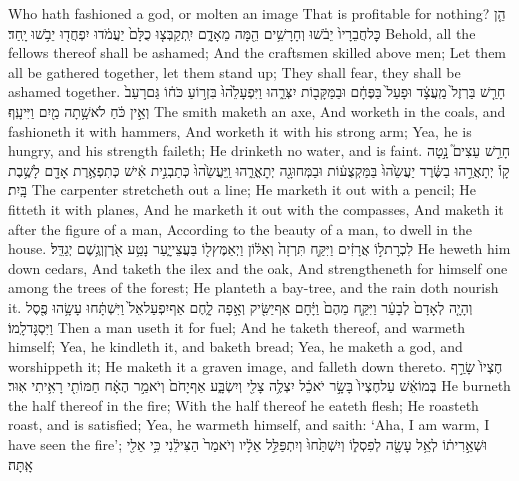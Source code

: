 {Who hath fashioned a god, or molten an image That is profitable for nothing?}
{הֵ֤ן כׇּל\maqqaf חֲבֵרָיו֙ יֵבֹ֔שׁוּ וְחָרָשִׁ֥ים הֵ֖מָּה מֵאָדָ֑ם יִֽתְקַבְּצ֤וּ כֻלָּם֙ יַעֲמֹ֔דוּ יִפְחֲד֖וּ יֵבֹ֥שׁוּ יָֽחַד׃}
{Behold, all the fellows thereof shall be ashamed; And the craftsmen skilled above men; Let them all be gathered together, let them stand up; They shall fear, they shall be ashamed together.}
{חָרַ֤שׁ בַּרְזֶל֙ מַֽעֲצָ֔ד וּפָעַל֙ בַּפֶּחָ֔ם וּבַמַּקָּב֖וֹת יִצְּרֵ֑הוּ וַיִּפְעָלֵ֙הוּ֙ בִּזְר֣וֹעַ כֹּח֔וֹ גַּם\maqqaf רָעֵב֙ וְאֵ֣ין כֹּ֔חַ לֹא\maqqaf שָׁ֥תָה מַ֖יִם וַיִּיעָֽף׃}
{The smith maketh an axe, And worketh in the coals, and fashioneth it with hammers, And worketh it with his strong arm; Yea, he is hungry, and his strength faileth; He drinketh no water, and is faint.}
{חָרַ֣שׁ עֵצִים֮ נָ֣טָה קָו֒ יְתָאֲרֵ֣הוּ בַשֶּׂ֔רֶד יַעֲשֵׂ֙הוּ֙ בַּמַּקְצֻע֔וֹת וּבַמְּחוּגָ֖ה יְתׇאֳרֵ֑הוּ וַֽיַּעֲשֵׂ֙הוּ֙ כְּתַבְנִ֣ית אִ֔ישׁ כְּתִפְאֶ֥רֶת אָדָ֖ם לָשֶׁ֥בֶת בָּֽיִת׃}
{The carpenter stretcheth out a line; He marketh it out with a pencil; He fitteth it with planes, And he marketh it out with the compasses, And maketh it after the figure of a man, According to the beauty of a man, to dwell in the house.}
{לִכְרׇת\maqqaf ל֣וֹ אֲרָזִ֔ים וַיִּקַּ֤ח תִּרְזָה֙ וְאַלּ֔וֹן וַיְאַמֶּץ\maqqaf ל֖וֹ בַּעֲצֵי\maqqaf יָ֑עַר נָטַ֥ע אֹ֖רֶ\footnotesize ן\normalsize  וְגֶ֥שֶׁם יְגַדֵּֽל׃}
{He heweth him down cedars, And taketh the ilex and the oak, And strengtheneth for himself one among the trees of the forest; He planteth a bay-tree, and the rain doth nourish it.}
{וְהָיָ֤ה לְאָדָם֙ לְבָעֵ֔ר וַיִּקַּ֤ח מֵהֶם֙ וַיָּ֔חׇם אַף\maqqaf יַשִּׂ֖יק וְאָ֣פָה לָ֑חֶם אַף\maqqaf יִפְעַל\maqqaf אֵל֙ וַיִּשְׁתָּ֔חוּ עָשָׂ֥הוּ פֶ֖סֶל וַיִּסְגׇּד\maqqaf לָֽמוֹ׃}
{Then a man useth it for fuel; And he taketh thereof, and warmeth himself; Yea, he kindleth it, and baketh bread; Yea, he maketh a god, and worshippeth it; He maketh it a graven image, and falleth down thereto.}
{חֶצְיוֹ֙ שָׂרַ֣ף בְּמוֹ\maqqaf אֵ֔שׁ עַל\maqqaf חֶצְיוֹ֙ בָּשָׂ֣ר יֹאכֵ֔ל יִצְלֶ֥ה צָלִ֖י וְיִשְׂבָּ֑ע אַף\maqqaf יָחֹם֙ וְיֹאמַ֣ר הֶאָ֔ח חַמּוֹתִ֖י רָאִ֥יתִי אֽוּר׃}
{He burneth the half thereof in the fire; With the half thereof he eateth flesh; He roasteth roast, and is satisfied; Yea, he warmeth himself, and saith: ‘Aha, I am warm, I have seen the fire’;}
{וּשְׁאֵ֣רִית֔וֹ לְאֵ֥ל עָשָׂ֖ה לְפִסְל֑וֹ  וְיִשְׁתַּ֙חוּ֙ וְיִתְפַּלֵּ֣ל אֵלָ֔יו וְיֹאמַר֙ הַצִּילֵ֔נִי כִּ֥י אֵלִ֖י אָֽתָּה׃}
